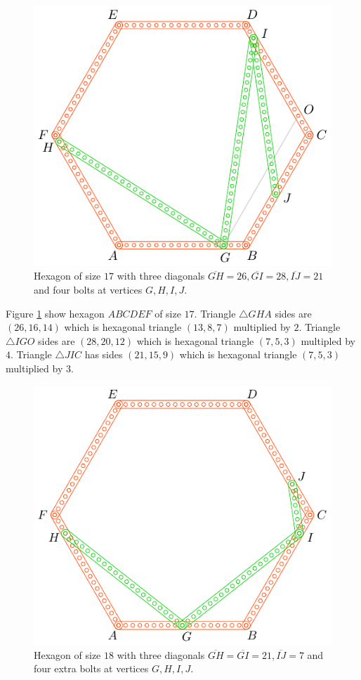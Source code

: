 \documentclass[11pt]{article}
\begin{document}
\begin{figure}[H]
\centering
\includegraphics[scale=1]{17/hexa-17a}
\caption{Hexagon of size $17$ with three diagonals $\overline{GH} = 26, \overline{GI} = 28, \overline{IJ} = 21$ and four bolts at vertices $G,H,I,J$.}
\label{fig:17a}
\end{figure}

Figure \ref{fig:17a} show hexagon $ABCDEF$ of size $17$. Triangle $\triangle{GHA}$ sides are $(26,16,14)$ which is hexagonal triangle $(13,8,7)$ multiplied by $2$. Triangle $\triangle{IGO}$ sides are $(28,20,12)$ which is hexagonal triangle $(7,5,3)$ multipled by $4$. Triangle $\triangle{JIC}$ has sides $(21,15,9)$ which is hexagonal triangle $(7,5,3)$ multiplied by $3$.

\begin{figure}[H]
\centering
\includegraphics[scale=1]{18/hexa-18a}
\caption{Hexagon of size $18$ with three diagonals $\overline{GH} = \overline{GI} = 21, \overline{IJ} = 7$ and four extra bolts at vertices $G,H,I,J$.}
\label{fig:18a}
\end{figure}
\end{document}

